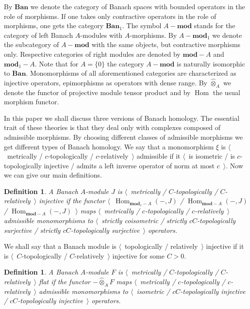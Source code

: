 \documentclass[12pt]{article}
\newtheorem{definition}[theorem]{Definition}
\newcommand{\projtens}{\mathbin{\widehat{\otimes}}}
\begin{document}
By $\mathbf{Ban}$ we denote the category of Banach spaces with bounded operators
in the role of morphisms. If one takes only contractive operators in the role of
morphisms, one gets the category $\mathbf{Ban}_1$. The symbol $A-\mathbf{mod}$
stands for the category of left Banach $A$-modules with $A$-morphisms. By
$A-\mathbf{mod}_1$ we denote the subcategory of $A-\mathbf{mod}$ with the same
objects, but contractive morphisms only. Respective categories of right modules
are denoted by $\mathbf{mod}-A$ and $\mathbf{mod}_1-A$. Note that for $A= \{0
\}$ the category $A-\mathbf{mod}$ is naturally isomorphic to $\mathbf{Ban}$.
Monomorphisms of all aforementioned categories are characterized as injective
operators, epimorphisms as operators with dense range. By $\projtens_A$ we
denote the functor of projective module tensor product and by
$\operatorname{Hom}$ the usual morphism functor.

In this paper we shall discuss three versions of Banach homology. The essential
trait of these theories is that they deal only with complexes composed of
admissible morphisms. By choosing different classes of admissible morphisms we
get different types of Banach homology. We say that a monomorphism $\xi$ is
$\langle$~metrically / $c$-topologically / $c$-relatively~$\rangle$ admissible
if it $\langle$~is isometric / is $c$-topologically injective / admits a left
inverse operator of norm at most $c$~$\rangle$. Now we can give our main
definitions.

\begin{definition} A Banach $A$-module $J$ is \emph{$\langle$~metrically /
$C$-topologically / $C$-relatively~$\rangle$ injective} if the functor
$\langle$~$\operatorname{Hom}_{\mathbf{mod}_1-A}(-,J)$ /
$\operatorname{Hom}_{\mathbf{mod}-A}(-,J)$ /
$\operatorname{Hom}_{\mathbf{mod}-A}(-,J)$~$\rangle$ maps $\langle$~metrically /
$c$-topologically / $c$-relatively~$\rangle$ admissible monomorphisms to
$\langle$~strictly coisometric / strictly $cC$-topologically surjective /
strictly $cC$-topologically surjective~$\rangle$ operators.
\end{definition}

We shall say that a Banach module is $\langle$~topologically /
relatively~$\rangle$ injective if it is $\langle$~$C$-topologically /
$C$-relatively~$\rangle$ injective for some $C>0$.

\begin{definition} A Banach $A$-module $F$ is \emph{$\langle$~metrically /
$C$-topologically / $C$-relatively~$\rangle$ flat} if the functor $-\projtens_A
F$ maps $\langle$~metrically / $c$-topologically / $c$-relatively~$\rangle$
admissible monomorphisms to $\langle$~isometric / $cC$-topologically injective /
$cC$-topologically injective~$\rangle$ operators.
\end{definition}
\end{document}
